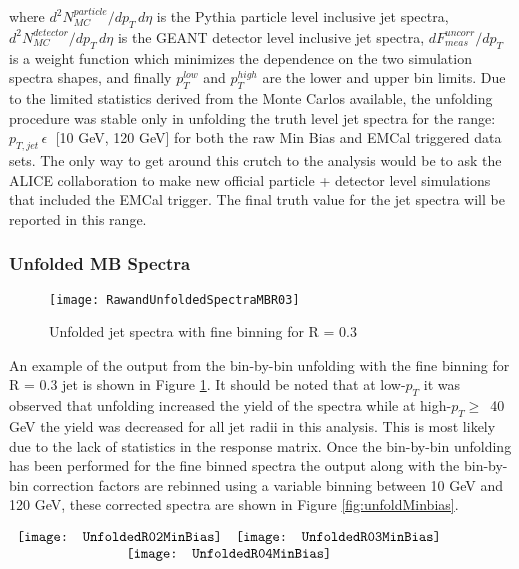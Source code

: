 \noindent
where $d^{2}N^{particle}_{MC}/dp_{T} \, d\eta$ is the Pythia particle level inclusive jet spectra, $d^{2}N^{detector}_{MC}/dp_{T} \, d\eta$ is the GEANT detector level inclusive jet spectra, $dF^{uncorr}_{meas} / dp_{T}$ is a weight function which minimizes the dependence on the two simulation spectra shapes, and finally $p_{T}^{low}$ and $p_{T}^{high}$ are the lower and upper bin limits.  Due to the limited statistics derived from the Monte Carlos available, the unfolding procedure was stable only in unfolding the truth level jet spectra for the range: $p_{T,jet} \, \epsilon \;$ [10 GeV, 120 GeV] for both the raw Min Bias and EMCal triggered data sets.  The only way to get around this crutch to the analysis would be to ask the ALICE collaboration to make new official particle + detector level simulations that included the EMCal trigger.  The final truth value for the jet spectra will be reported in this range.



\subsubsection{Unfolded MB Spectra}

\begin{figure}[h]
\texttt{[image: RawandUnfoldedSpectraMBR03]}
\centering
\caption{Unfolded jet spectra with fine binning for R = 0.3}
\label{fig:Unfoldfine}
\end{figure}

An example of the output from the bin-by-bin unfolding with the fine binning for R = 0.3 jet is shown in Figure \ref{fig:Unfoldfine}.  It should be noted that at low-$p_{T}$ it was observed that unfolding increased the yield of the spectra while at high-$p_{T} \geq \,$ 40 GeV the yield was decreased for all jet radii in this analysis.  This is most likely due to the lack of statistics in the response matrix.  Once the bin-by-bin unfolding has been performed for the fine binned spectra the output along with the bin-by-bin correction factors are rebinned using a variable binning between 10 GeV and 120 GeV, these corrected spectra are shown in Figure \ref{fig:unfoldMinbias}.


\begin{figure*}[t!]
$\begin{array}{rl}
    \texttt{[image: UnfoldedR02MinBias]} &
    \texttt{[image: UnfoldedR03MinBias]}\\
    \multicolumn{2}{c}{\texttt{[image: UnfoldedR04MinBias]}}
\end{array}$
\caption[Corrected Jet Spectra to Monte Carlo level for R = 0.2, R=0.3, and R = 0.4 jets.]{\label{fig:unfoldMinbias}Unfolded Min Bias Jet Spectra with correction factors, $C_{MC}$, for R = 0.2, R=0.3, and R = 0.4 jets.}
\end{figure*}

